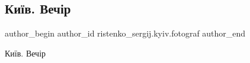  
 
 
 
 

\subsection{Київ. Вечір}
\label{sec:18_12_2022.fb.ristenko_sergij.kyiv.fotograf.1.ki_v__vech_r}

\ifcmt
 author_begin
   author_id ristenko_sergij.kyiv.fotograf
 author_end
\fi

Київ. Вечір
